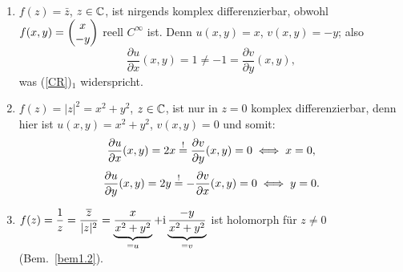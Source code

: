 \documentclass[a4paper,twoside,DIV15,BCOR12mm]{scrbook}
\begin{document}
\begin{bsp} \label{bsp1.5}
\begin{enumerate}
\item $f(z) = \bar{z}$, $z\in\mathbb{C}$, ist nirgends komplex differenzierbar, obwohl $f(x,y) = \left(\!\!\!\begin{array}{c}x\\-y\end{array}\!\!\!\right)$ reell $C^\infty$ ist. Denn $u(x,y) = x$, $v(x,y) = -y$; also 
\[\frac{\partial u}{\partial x}(x,y) = 1 \neq -1 = \frac{\partial v}{\partial y}(x,y),\]
was (\ref{CR})$_1$ widerspricht.
\item $f(z) = |z|^2 = x^2 + y^2$, $z\in\mathbb{C}$, ist nur in $z=0$ komplex differenzierbar, denn hier ist $u(x,y) = x^2+y^2$, $v(x,y) = 0$ und somit:
\[\frac{\partial u}{\partial x}(x,y) = 2x \stackrel{!}{=} \frac{\partial v}{\partial y}(x,y) = 0 \iff x=0,\]
\[\frac{\partial u}{\partial y}(x,y) = 2y \stackrel{!}{=} -\frac{\partial v}{\partial x}(x,y) = 0 \iff y=0.\]
\item $\displaystyle f(z) = \frac{1}{z} = \frac{\overline{z}}{|z|^2} = \underbrace{\frac{x}{x^2+y^2}}_{=u} + \mathrm{i}\underbrace{\frac{-y}{x^2+y^2}}_{=v}$ ist holomorph für $z\neq 0$ (Bem.~\ref{bem1.2}).
\end{enumerate}
\end{bsp}
\end{document}
